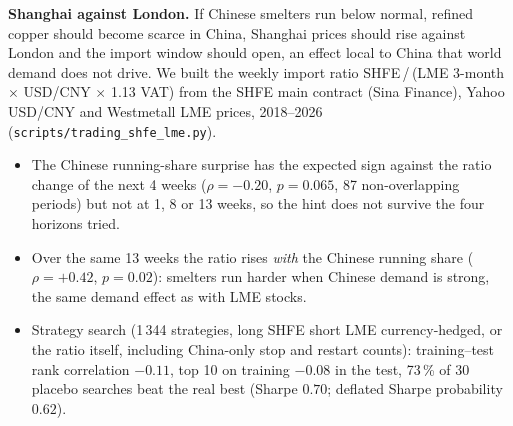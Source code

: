 \documentclass[10pt,a4paper]{article}
\begin{document}
\textbf{Shanghai against London.} If Chinese smelters run below normal, refined copper should become scarce in China, Shanghai prices should rise against London and the import window should open, an effect local to China that world demand does not drive. We built the weekly import ratio SHFE\,/\,(LME 3-month $\times$ USD/CNY $\times$ 1.13 VAT) from the SHFE main contract (Sina Finance), Yahoo USD/CNY and Westmetall LME prices, 2018--2026 (\texttt{scripts/trading\_shfe\_lme.py}).
\begin{itemize}[leftmargin=1.2em]
  \item The Chinese running-share surprise has the expected sign against the ratio change of the next 4 weeks ($\rho=-0.20$, $p=0.065$, 87 non-overlapping periods) but not at 1, 8 or 13 weeks, so the hint does not survive the four horizons tried.
  \item Over the same 13 weeks the ratio rises \emph{with} the Chinese running share ($\rho=+0.42$, $p=0.02$): smelters run harder when Chinese demand is strong, the same demand effect as with LME stocks.
  \item Strategy search (1\,344 strategies, long SHFE short LME currency-hedged, or the ratio itself, including China-only stop and restart counts): training--test rank correlation $-0.11$, top 10 on training $-0.08$ in the test, 73\,\% of 30 placebo searches beat the real best (Sharpe $0.70$; deflated Sharpe probability $0.62$).
\end{itemize}
\end{document}
